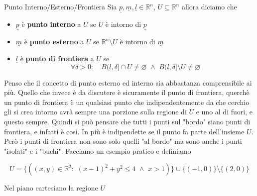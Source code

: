 \documentclass{rapport}
\begin{document}
\begin{definizione}{Punto Interno/Esterno/Frontiera}{}
  Sia $\underline{p},\underline{m},\underline{l}\in \mathbb{R}^n$, $U \subseteq \mathbb{R}^n$ allora diciamo che 
  \begin{itemize}
    \item $\underline{p}$ è \textbf{punto interno} a $U$ se $U$ è intorno di $\underline{p}$
    \item $\underline{m}$ è \textbf{punto esterno} a $U$ se $\mathbb{R}^n\setminus U$ è intorno di $\underline{m}$
    \item $\underline{l}$ è \textbf{punto di frontiera} a $U$ se 
    \[
    \forall \delta > 0: \quad B(\underline{l}, \delta] \cap U \neq \varnothing\,\, \land \,\, B(\underline{l}, \delta] \setminus U \neq \varnothing
    \]
  \end{itemize}
\end{definizione}


Penso che il concetto di punto esterno ed interno sia abbastanza comprensibile ai più. Quello che invece è da discutere è sicuramente il punto di frontiera, querchè un punto di frontiera è un qualsiasi punto che indipendentemente da che cerchio gli si crea intorno avrà sempre una porzione sulla regione di $U$ e uno al di fuori, e questo sempre. Quindi si può pensare che tutti i punti sul "bordo" siano punti di frontiera, e infatti è così. In più è indipendette se il punto fa parte dell'insieme $U$. Però i punti di frontiera non sono solo quelli "al bordo" ma sono anche i punti "isolati" e i "buchi".  Facciamo un esempio pratico e definiamo

\[
U = \{((x,y) \in \mathbb{R}^2 : \,\, (x-1)^2+y^2\leq 4 \,\,\land\,\, x>1)\} \cup \{(-1,0)\} \setminus \{(2,0)\}
\]


Nel piano cartesiano la regione $U$
\end{document}
